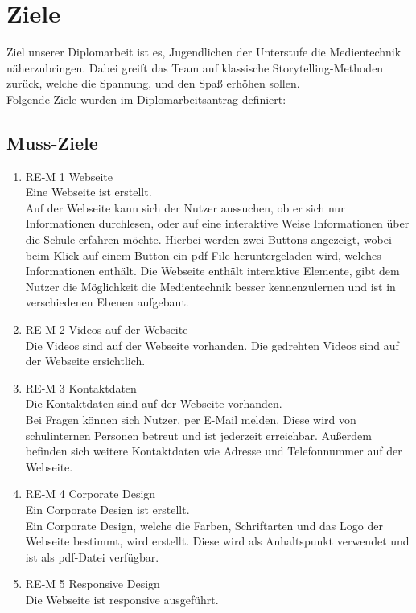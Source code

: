 \chapter{Ziele}

Ziel unserer Diplomarbeit ist es, Jugendlichen der Unterstufe die Medientechnik näherzubringen. Dabei greift das Team auf klassische Storytelling-Methoden zurück, welche die Spannung, und den Spaß erhöhen sollen.\\ Folgende Ziele wurden im Diplomarbeitsantrag definiert:

\section{Muss-Ziele}
\begin{enumerate}
\item RE-M 1 Webseite\\
Eine Webseite ist erstellt.\\
Auf der Webseite kann sich der Nutzer aussuchen, ob er sich nur Informationen durchlesen, oder auf eine interaktive Weise Informationen über die Schule erfahren möchte. Hierbei werden zwei Buttons angezeigt, wobei beim Klick auf einem Button ein pdf-File heruntergeladen wird, welches Informationen enthält. Die Webseite enthält interaktive Elemente, gibt dem Nutzer die Möglichkeit die Medientechnik besser kennenzulernen und ist in verschiedenen Ebenen aufgebaut.
\item RE-M 2 Videos auf der Webseite\\
Die Videos sind auf der Webseite vorhanden.
Die gedrehten Videos sind auf der Webseite ersichtlich.
\item RE-M 3 Kontaktdaten\\
Die Kontaktdaten sind auf der Webseite vorhanden.\\
Bei Fragen können sich Nutzer, per E-Mail melden. Diese wird von schulinternen Personen betreut und ist jederzeit erreichbar. Außerdem befinden sich weitere Kontaktdaten wie Adresse und Telefonnummer auf der Webseite.
\item RE-M 4 Corporate Design\\
Ein Corporate Design ist erstellt.\\
Ein Corporate Design, welche die Farben, Schriftarten und das Logo der Webseite bestimmt, wird erstellt. Diese wird als Anhaltspunkt verwendet und ist als pdf-Datei verfügbar.
\item RE-M 5 Responsive Design\\
Die Webseite ist responsive ausgeführt.\\

\end{enumerate}
